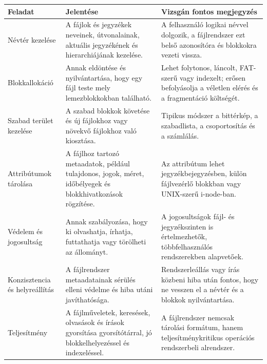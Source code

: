 \begin{tabularx}{\textwidth}{L{34mm}X X}
\toprule
\textbf{Feladat} & \textbf{Jelentése} & \textbf{Vizsgán fontos megjegyzés} \\
\midrule
Névtér kezelése & A fájlok és jegyzékek neveinek, útvonalainak, aktuális jegyzékének és hierarchiájának kezelése. & A felhasználó logikai névvel dolgozik, a fájlrendszer ezt belső azonosítóra és blokkokra vezeti vissza. \\
Blokkallokáció & Annak eldöntése és nyilvántartása, hogy egy fájl teste mely lemezblokkokban található. & Lehet folytonos, láncolt, FAT-szerű vagy indexelt; erősen befolyásolja a véletlen elérés és a fragmentáció költségét. \\
Szabad terület kezelése & A szabad blokkok követése és új fájlokhoz vagy növekvő fájlokhoz való kiosztása. & Tipikus módszer a bittérkép, a szabadlista, a csoportosítás és a számlálás. \\
Attribútumok tárolása & A fájlhoz tartozó metaadatok, például tulajdonos, jogok, méret, időbélyegek és blokkhivatkozások rögzítése. & Az attribútum lehet jegyzékbejegyzésben, külön fájlvezérlő blokkban vagy UNIX-szerű i-node-ban. \\
Védelem és jogosultság & Annak szabályozása, hogy ki olvashatja, írhatja, futtathatja vagy törölheti az állományt. & A jogosultságok fájl- és jegyzékszinten is értelmezhetők, többfelhasználós rendszerekben alapvetőek. \\
Konzisztencia és helyreállítás & A fájlrendszer metaadatainak sérülés elleni védelme és hiba utáni javíthatósága. & Rendszerleállás vagy írás közbeni hiba után fontos, hogy ne vesszen el a névtér és a blokkok nyilvántartása. \\
Teljesítmény & A fájlműveletek, keresések, olvasások és írások gyorsítása gyorsítótárral, jó blokkelhelyezéssel és indexeléssel. & A fájlrendszer nemcsak tárolási formátum, hanem teljesítménykritikus operációs rendszerbeli alrendszer. \\
\bottomrule
\end{tabularx}
